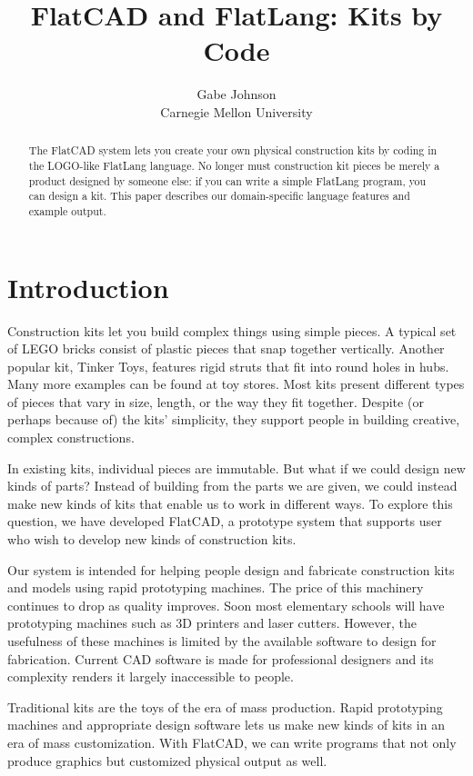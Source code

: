 \documentclass[times, 10pt,twocolumn]{article}
\title{FlatCAD and FlatLang: Kits by Code}
\author{
Gabe Johnson\\
Carnegie Mellon University
}
\begin{document}
 \maketitle


\begin{abstract}
The \nohyphens{FlatCAD} system lets you create your own physical
construction kits by coding in the LOGO-like \nohyphens{FlatLang}
language. No longer must construction kit pieces be merely a product
designed by someone else: if you can write a simple
\nohyphens{FlatLang} program, you can design a kit. This paper
describes our domain-specific language features and example output.
\end{abstract}

\section{Introduction}

Construction kits let you build complex things using simple pieces. A
typical set of LEGO bricks consist of plastic pieces that snap
together vertically. Another popular kit, Tinker Toys, features rigid
struts that fit into round holes in hubs. Many more examples can be
found at toy stores. Most kits present different types of pieces that
vary in size, length, or the way they fit together. Despite (or
perhaps because of) the kits' simplicity, they support people in
building creative, complex constructions.

In existing kits, individual pieces are immutable. But what if we
could design new kinds of parts? Instead of building from the parts we
are given, we could instead make new kinds of kits that enable us to
work in different ways. To explore this question, we have developed
\nohyphens{FlatCAD}, a prototype system that supports user who wish to
develop new kinds of construction kits.

Our system is intended for helping people design and fabricate
construction kits and models using rapid prototyping machines. The
price of this machinery continues to drop as quality improves. Soon
most elementary schools will have prototyping machines such as 3D
printers and laser cutters. However, the usefulness of these machines
is limited by the available software to design for
fabrication. Current CAD software is made for professional designers
and its complexity renders it largely inaccessible to people.

Traditional kits are the toys of the era of mass production. Rapid
prototyping machines and appropriate design software lets us make new
kinds of kits in an era of mass customization. With
\nohyphens{FlatCAD}, we can write programs that not only produce
graphics but customized physical output as well.
\end{document}
